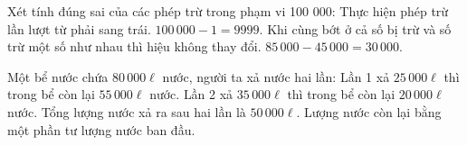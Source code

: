 \begin{ex} %
Xét tính đúng sai của các phép trừ trong phạm vi 100 000:
\choiceTF
{\True Thực hiện phép trừ lần lượt từ phải sang trái.}
{$100\,000 - 1 = 9999$.}
{\True Khi cùng bớt ở cả số bị trừ và số trừ một số như nhau thì hiệu không thay đổi.}
{$85\,000 - 45\,000 = 30\,000$.}
\end{ex}

\begin{ex} %
Một bể nước chứa $80\,000\ell$ nước, người ta xả nước hai lần:
\choiceTF
{\True Lần 1 xả $25\,000\ell$ thì trong bể còn lại $55\,000\ell$ nước.}
{\True Lần 2 xả $35\,000\ell$ thì trong bể còn lại $20\,000\ell$ nước.}
{Tổng lượng nước xả ra sau hai lần là $50\,000\ell$.}
{\True Lượng nước còn lại bằng một phần tư lượng nước ban đầu.}
\end{ex}

